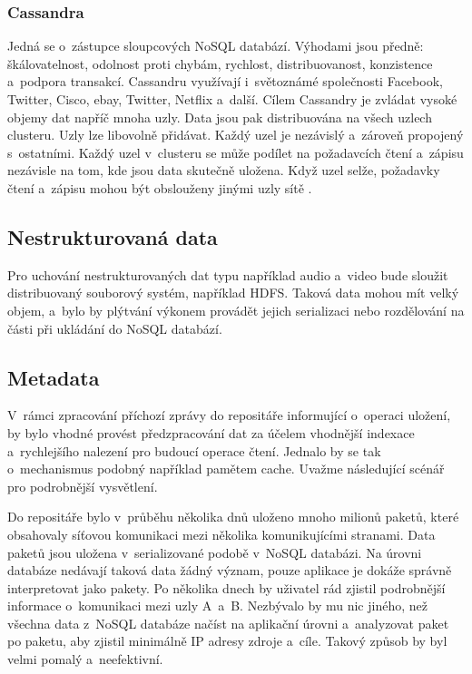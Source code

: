 \subsubsection{Cassandra}
Jedná se o~zástupce sloupcových NoSQL databází. Výhodami jsou předně: škálovatelnost, odolnost proti chybám, rychlost, distribuovanost, konzistence a~podpora transakcí. Cassandru využívají i~světoznámé společnosti Facebook, Twitter, Cisco, ebay, Twitter, Netflix a~další. Cílem Cassandry je zvládat vysoké objemy dat napříč mnoha uzly. Data jsou pak distribuována na všech uzlech clusteru. Uzly lze libovolně přidávat. Každý uzel je nezávislý a~zároveň propojený s~ostatními. Každý uzel v~clusteru se může podílet na požadavcích čtení a~zápisu nezávisle na tom, kde jsou data skutečně uložena. Když uzel selže, požadavky čtení a~zápisu mohou být obslouženy jinými uzly sítě \cite{cassandraTutorialsPoint}.

\subsection{Nestrukturovaná data}
Pro uchování nestrukturovaných dat typu například audio a~video bude sloužit distribuovaný souborový systém, například HDFS. Taková data mohou mít velký objem, a~bylo by plýtvání výkonem provádět jejich serializaci nebo rozdělování na části při ukládání do NoSQL databází.

\subsection{Metadata} \label{metadata}
V~rámci zpracování příchozí zprávy do repositáře informující o~operaci uložení, by bylo vhodné provést předzpracování dat za účelem vhodnější indexace a~rychlejšího nalezení pro budoucí operace čtení. Jednalo by se tak o~mechanismus podobný například pamětem cache. Uvažme následující scénář pro podrobnější vysvětlení.

Do repositáře bylo v~průběhu několika dnů uloženo mnoho milionů paketů, které obsahovaly síťovou komunikaci mezi několika komunikujícími stranami. Data paketů jsou uložena v~serializované podobě v~NoSQL databázi. Na úrovni databáze nedávají taková data žádný význam, pouze aplikace je dokáže správně interpretovat jako pakety. Po několika dnech by uživatel rád zjistil podrobnější informace o~komunikaci mezi uzly A~a~B. Nezbývalo by mu nic jiného, než všechna data z~NoSQL databáze načíst na aplikační úrovni a~analyzovat paket po paketu, aby zjistil minimálně IP adresy zdroje a~cíle. Takový způsob by byl velmi pomalý a~neefektivní.

